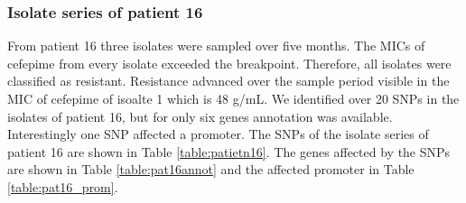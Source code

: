 \subsubsection{Isolate series of patient 16}
From patient 16 three isolates were sampled over five months. The MICs of cefepime from every isolate exceeded the breakpoint. Therefore, all isolates were classified as resistant. Resistance advanced over the sample period visible in the MIC of cefepime of isoalte 1 which is 48 \textmu g/mL. We identified over 20 SNPs in the isolates of patient 16, but for only six genes annotation was available. Interestingly one SNP affected a promoter. The SNPs of the isolate series of patient 16 are shown in  Table \ref{table:patietn16}. The genes affected by the SNPs are shown in Table \ref{table:pat16annot} and the affected promoter in Table \ref{table:pat16_prom}.
